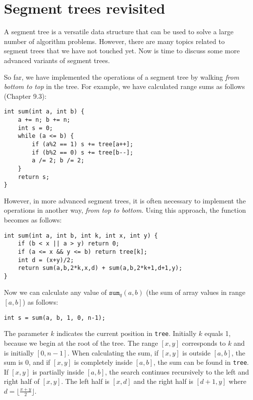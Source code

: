 \chapter{Segment trees revisited}


A segment tree is a versatile data structure
that can be used to solve a large number of algorithm problems.
However, there are many topics related to segment trees
that we have not touched yet.
Now is time to discuss some more advanced variants
of segment trees.

So far, we have implemented the operations
of a segment tree by walking \emph{from bottom to top}
in the tree.
For example, we have calculated
range sums as follows (Chapter 9.3):

\begin{lstlisting}
int sum(int a, int b) {
    a += n; b += n;
    int s = 0;
    while (a <= b) {
        if (a%2 == 1) s += tree[a++];
        if (b%2 == 0) s += tree[b--];
        a /= 2; b /= 2;
    }
    return s;
}
\end{lstlisting}

However, in more advanced segment trees,
it is often necessary to implement the operations
in another way, \emph{from top to bottom}.
Using this approach, the function becomes as follows:
\begin{lstlisting}
int sum(int a, int b, int k, int x, int y) {
    if (b < x || a > y) return 0;
    if (a <= x && y <= b) return tree[k];
    int d = (x+y)/2;
    return sum(a,b,2*k,x,d) + sum(a,b,2*k+1,d+1,y);
}
\end{lstlisting}

Now we can calculate any value of $\texttt{sum}_q(a,b)$
(the sum of array values in range $[a,b]$) as follows:
\begin{lstlisting}
int s = sum(a, b, 1, 0, n-1);
\end{lstlisting}

The parameter $k$ indicates the current position
in \texttt{tree}.
Initially $k$ equals 1, because we begin
at the root of the tree.
The range $[x,y]$ corresponds to $k$
and is initially $[0,n-1]$.
When calculating the sum,
if $[x,y]$ is outside $[a,b]$,
the sum is 0,
and if $[x,y]$ is completely inside $[a,b]$,
the sum can be found in \texttt{tree}.
If $[x,y]$ is partially inside $[a,b]$,
the search continues recursively to the
left and right half of $[x,y]$.
The left half is $[x,d]$
and the right half is $[d+1,y]$
where $d=\lfloor \frac{x+y}{2} \rfloor$.

